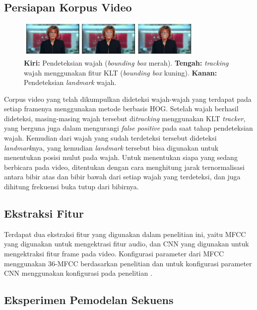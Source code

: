 \subsection{Persiapan Korpus Video}

\begin{figure}[h]
    \centering
    \includegraphics[width=0.8\textwidth]{resources/images/face-detection.png}
    \caption{\textbf{Kiri:} Pendeteksian wajah (\textit{bounding box} merah). \textbf{Tengah:} \textit{tracking} wajah menggunakan fitur KLT (\textit{bounding box} kuning). \textbf{Kanan:} Pendeteksian \textit{landmark} wajah.}
    \label{fig:face-detection}
\end{figure}

Corpus video yang telah dikumpulkan dideteksi wajah-wajah yang terdapat pada setiap framenya menggunakan metode berbasis HOG. Setelah wajah berhasil dideteksi, masing-masing wajah tersebut di\textit{tracking} menggunakan KLT \textit{tracker}, yang berguna juga dalam mengurangi \textit{false positive} pada saat tahap pendeteksian wajah. Kemudian dari wajah yang sudah terdeteksi tersebut dideteksi \textit{landmark}nya, yang kemudian \textit{landmark} tersebut bisa digunakan untuk menentukan posisi mulut pada wajah. Untuk menentukan siapa yang sedang berbicara pada video, ditentukan dengan cara menghitung jarak ternormalisasi antara bibir atas dan bibir bawah dari setiap wajah yang terdeteksi, dan juga dihitung frekuensi buka tutup dari bibirnya.


\subsection{Ekstraksi Fitur}

Terdapat dua ekstraksi fitur yang digunakan dalam penelitian ini, yaitu MFCC yang digunakan untuk mengektrasi fitur audio, dan CNN yang digunakan untuk mengektraksi fitur frame pada video. Konfigurasi parameter dari MFCC menggunakan  36-MFCC berdasarkan penelitian \textcite{Yuwan2018} dan untuk konfigurasi parameter CNN menggunakan konfigurasi pada penelitian \textcite{Chung2017}.


\subsection{Eksperimen Pemodelan Sekuens}

